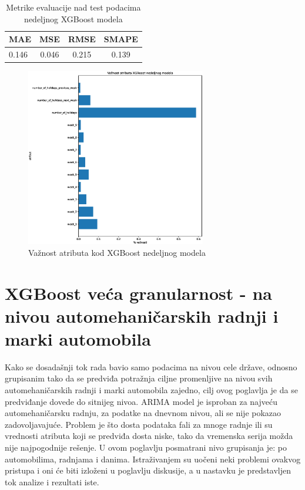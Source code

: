 \documentclass[12pt,oneside]{memoir}
\begin{document}
\begin{table}
\centering
\caption{Metrike evaluacije nad test podacima nedeljnog XGBoost modela}
\label{tbl: xgboost_nedeljni_metrike}
\begin{tabular}{ |l|c|c|c|} 
\hline
MAE & MSE & RMSE & SMAPE\\
\hline
0.146 & 0.046 & 0.215 & 0.139\\
\hline
\end{tabular}
\end{table}
\begin{figure}[!ht]
  \centering
  \includegraphics[width=0.7\textwidth]{./grafici/xgboost_nedeljni_vaznost_atributa.eps}
  \caption{Važnost atributa kod XGBoost nedeljnog modela}
  \label{fig: xgboost_nedeljno_importance}
\end{figure}

\section{XGBoost veća granularnost - na nivou automehaničarskih radnji i marki automobila}
Kako se dosadašnji tok rada bavio samo podacima na nivou cele države, odnosno grupisanim tako da se predviđa potražnja ciljne promenljive na nivou svih automehaničarskih radnji i marki automobila zajedno, cilj ovog poglavlja je da se predviđanje dovede do sitnijeg nivoa. ARIMA model je isproban za najveću automehaničarsku radnju, za podatke na dnevnom nivou, ali se nije pokazao zadovoljavajuće. Problem je što dosta podataka fali za mnoge radnje ili su vrednosti atributa koji se predviđa dosta niske, tako da vremenska serija možda nije najpogodnije rešenje. U ovom poglavlju posmatrani nivo grupisanja je: po automobilima, radnjama i danima. Istraživanjem su uočeni neki problemi ovakvog pristupa i oni će biti izloženi u poglavlju diskusije, a u nastavku je predstavljen tok analize i rezultati iste.
\end{document}
